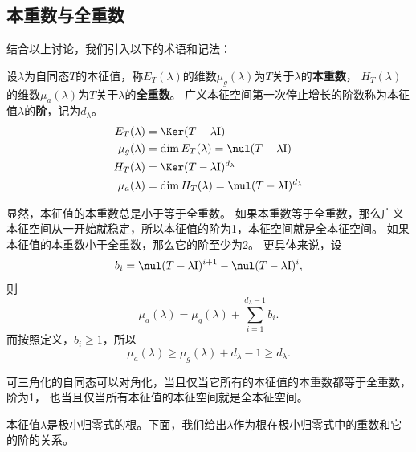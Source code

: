 \documentclass[12pt,UTF8]{ctexbook}
\begin{document}
\subsection{本重数与全重数}
结合以上讨论，我们引入以下的术语和记法：

\begin{df}\label{df:6_4_3}
    设$\lambda$为自同态$T$的本征值，称$E_T(\lambda)$的维数$\mu_g(\lambda)$为$T$关于$\lambda$的\textbf{本重数}，
    $H_T(\lambda)$的维数$\mu_a(\lambda)$为$T$关于$\lambda$的\textbf{全重数}。
    广义本征空间第一次停止增长的阶数称为本征值$\lambda$的\textbf{阶}，记为$d_\lambda$。
    \begin{align*}
        E_T(\lambda) &= \Ker (T - \lambda\mathrm{I})  \\
        \mu_g(\lambda) &= \dim E_T(\lambda) = \nul (T - \lambda\mathrm{I})  \\
        H_T(\lambda) &= \Ker (T - \lambda\mathrm{I})^{d_\lambda}  \\
        \mu_a(\lambda) &= \dim H_T(\lambda) = \nul (T - \lambda\mathrm{I})^{d_\lambda} 
    \end{align*}
\end{df}
显然，本征值的本重数总是小于等于全重数。
如果本重数等于全重数，那么广义本征空间从一开始就稳定，所以本征值的阶为1，本征空间就是全本征空间。
如果本征值的本重数小于全重数，那么它的阶至少为2。
更具体来说，设
$$ b_i = \nul (T - \lambda\mathrm{I})^{i+1} - \nul (T - \lambda\mathrm{I})^{i},$$
则
$$ \mu_a(\lambda) = \mu_g(\lambda) + \sum_{i=1}^{d_\lambda-1} b_i.$$
而按照定义，$b_i \geqslant 1$，所以
$$ \mu_a(\lambda) \geqslant \mu_g(\lambda) + d_\lambda - 1 \geqslant d_\lambda.$$

可三角化的自同态可以对角化，当且仅当它所有的本征值的本重数都等于全重数，阶为1，
也当且仅当所有本征值的本征空间就是全本征空间。

本征值$\lambda$是极小归零式的根。下面，我们给出$\lambda$作为根在极小归零式中的重数和它的阶的关系。
\end{document}
